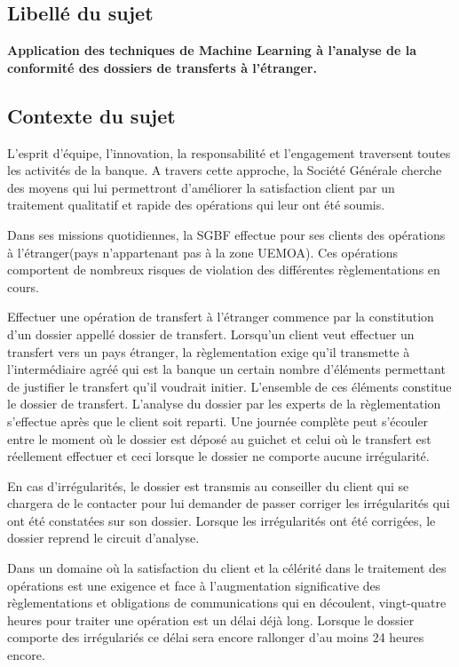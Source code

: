 \subsection{Libellé du sujet}

\textbf{Application des techniques de Machine Learning à l’analyse de la 
conformité des dossiers de transferts à l'étranger.}

 \subsection{Contexte du sujet}

 L’esprit d'équipe, l’innovation, la responsabilité et l'engagement 
 traversent toutes les activités de la banque.  A travers cette approche,
 la Société Générale cherche des moyens qui lui permettront d’améliorer
 la satisfaction client par un traitement qualitatif et rapide des 
 opérations qui leur ont été soumis. 
 
 Dans ses missions quotidiennes, la SGBF effectue pour ses clients des 
 opérations à l’étranger(pays n'appartenant pas à la zone UEMOA). Ces 
 opérations comportent de nombreux risques de violation des différentes 
 règlementations en cours.

Effectuer une opération de transfert à l'étranger commence par la constitution
d'un dossier appellé dossier de transfert.
Lorsqu’un client veut effectuer un transfert vers un pays  étranger, la
règlementation exige qu’il transmette à l’intermédiaire agréé qui est la banque
un certain nombre d’éléments permettant de justifier le transfert qu’il voudrait
initier. L'ensemble de ces éléments constitue le dossier de transfert. L’analyse
du dossier par les experts de la règlementation s’effectue après que le client 
soit reparti. Une journée complète peut s'écouler entre le moment où le dossier
est déposé au guichet et celui où le transfert est réellement effectuer et ceci 
lorsque le dossier ne comporte aucune irrégularité. 

En cas d’irrégularités, le dossier est transmis au conseiller du client qui se 
chargera de le contacter pour lui demander de passer corriger les irrégularités
qui ont été constatées sur son dossier. Lorsque les irrégularités ont été
corrigées, le dossier reprend le circuit d'analyse.

Dans un domaine où la satisfaction du client et la célérité dans le 
traitement des opérations est une exigence et face à l'augmentation 
significative des règlementations et obligations de communications qui en
découlent, vingt-quatre heures pour traiter une opération est un délai déjà
long. Lorsque le dossier comporte des irrégulariés ce délai sera encore
rallonger d'au moins 24 heures encore. 

